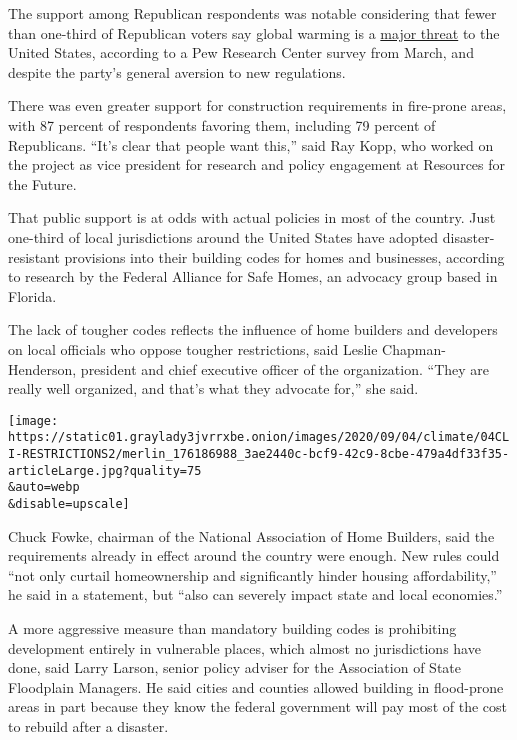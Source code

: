 The support among Republican respondents was notable considering that
fewer than one-third of Republican voters say global warming is a
\href{https://www.pewresearch.org/global/2020/04/13/americans-see-spread-of-disease-as-top-international-threat-along-with-terrorism-nuclear-weapons-cyberattacks/}{major
threat} to the United States, according to a Pew Research Center survey
from March, and despite the party's general aversion to new regulations.

There was even greater support for construction requirements in
fire-prone areas, with 87 percent of respondents favoring them,
including 79 percent of Republicans. ``It's clear that people want
this,'' said Ray Kopp, who worked on the project as vice president for
research and policy engagement at Resources for the Future.

That public support is at odds with actual policies in most of the
country. Just one-third of local jurisdictions around the United States
have adopted disaster-resistant provisions into their building codes for
homes and businesses, according to research by the Federal Alliance for
Safe Homes, an advocacy group based in Florida.

The lack of tougher codes reflects the influence of home builders and
developers on local officials who oppose tougher restrictions, said
Leslie Chapman-Henderson, president and chief executive officer of the
organization. ``They are really well organized, and that's what they
advocate for,'' she said.

\texttt{[image: https://static01.graylady3jvrrxbe.onion/images/2020/09/04/climate/04CLI-RESTRICTIONS2/merlin\_176186988\_3ae2440c-bcf9-42c9-8cbe-479a4df33f35-articleLarge.jpg?quality=75\\\&auto=webp\\\&disable=upscale]}

Chuck Fowke, chairman of the National Association of Home Builders, said
the requirements already in effect around the country were enough. New
rules could ``not only curtail homeownership and significantly hinder
housing affordability,'' he said in a statement, but ``also can severely
impact state and local economies.''

A more aggressive measure than mandatory building codes is prohibiting
development entirely in vulnerable places, which almost no jurisdictions
have done, said Larry Larson, senior policy adviser for the Association
of State Floodplain Managers. He said cities and counties allowed
building in flood-prone areas in part because they know the federal
government will pay most of the cost to rebuild after a disaster.

